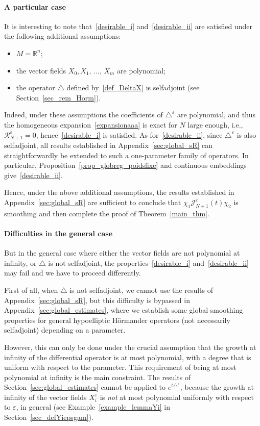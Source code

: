 \documentclass[AHL,Unicode,published]{cedram}
\newcommand*\R{\mathbb{R}}
\newcommand{\calR}{\mathcal{R}}
\newcommand{\calJ}{\mathcal{J}}
\begin{document}
\paragraph{A particular case} It is interesting to note that~\eqref{desirable_i} and~\eqref {desirable_ii} are satisfied under the following additional assumptions:
\begin{itemize}
\item $M=\R^n$;
\item the vector fields $X_0, X_1,\,\ldots,\,X_m$ are polynomial;
\item the operator $\triangle$ defined by~\eqref{def_DeltaX} is selfadjoint (see Section~\ref{sec_rem_Horm}).
\end{itemize}
Indeed, under these assumptions the coefficients of $\triangle^\varepsilon$ are polynomial, and thus the homogeneous expansion~\eqref{expansionaaa} is exact for $N$ large enough, i.e., $\calR_{N+1}^\varepsilon=0$, hence~\eqref{desirable_i} is satisfied. As for~\eqref{desirable_ii}, since $\triangle^\varepsilon$ is also selfadjoint, all results established in Appendix~\ref{sec:global_sR} can straightforwardly be extended to such a one-parameter family of operators. In particular, Proposition~\ref{prop_globreg_poidsfixe} and continuous embeddings give~\eqref{desirable_ii}.

Hence, under the above additional assumptions, the results established in Appendix~\ref{sec:global_sR} are sufficient to conclude that $\chi_1\calJ_{N+1}^\varepsilon(t)\chi_2$ is smoothing and then complete the proof of Theorem~\ref{main_thm}.

\break

\paragraph{Difficulties in the general case}
But in the general case where either the vector fields are not polynomial at infinity, or $\triangle$ is not selfadjoint, the properties~\eqref{desirable_i} and~\eqref{desirable_ii} may fail and we have to proceed differently.

First of all, when $\triangle$ is not selfadjoint, we cannot use the results of Appendix~\ref{sec:global_sR}, but this difficulty is bypassed in Appendix~\ref{sec:global_estimates}, where we establish some global smoothing properties for general hypoelliptic H\"ormander operators (not necessarily selfadjoint) depending on a parameter.

However, this can only be done under the crucial assumption that the growth at infinity of the differential operator is at most polynomial, with a degree that is uniform with respect to the parameter. This requirement of being at most polynomial at infinity is the main constraint. The results of Section~\ref{sec:global_estimates} cannot be applied to $e^{t\triangle^\varepsilon}$, because the growth at infinity of the vector fields $X_i^\varepsilon$ is \emph{not} at most polynomial uniformly with respect to $\varepsilon$, in general (see Example~\ref{example_lemmaYi} in Section~\ref{sec_defYiepsgam}).
\end{document}
